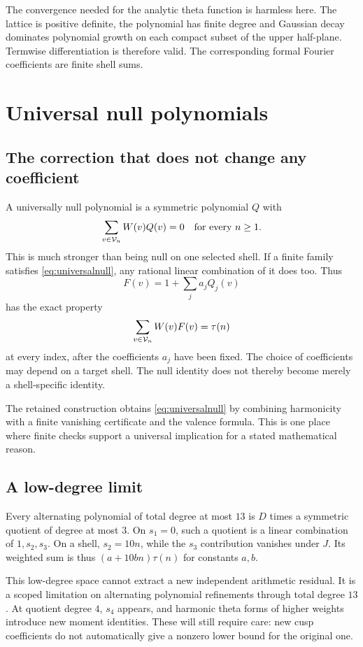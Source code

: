 The convergence needed for the analytic theta function is harmless here. The lattice is positive definite, the polynomial has finite degree and Gaussian decay dominates polynomial growth on each compact subset of the upper half-plane. Termwise differentiation is therefore valid. The corresponding formal Fourier coefficients are finite shell sums.

\chapter{Universal null polynomials}\label{ch:nulls}
\section{The correction that does not change any coefficient}
A universally null polynomial is a symmetric polynomial $Q$ with
\begin{equation}\label{eq:universalnull}
\sum_{v\in\mathcal V_n}W(v)Q(v)=0\quad\text{for every }n\ge1.
\end{equation}
This is much stronger than being null on one selected shell. If a finite family satisfies \eqref{eq:universalnull}, any rational linear combination of it does too. Thus
\[
F(v)=1+\sum_j a_jQ_j(v)
\]
has the exact property
\begin{equation}\label{eq:correctedtotal}
\sum_{v\in\mathcal V_n}W(v)F(v)=\tau(n)
\end{equation}
at every index, after the coefficients $a_j$ have been fixed. The choice of coefficients may depend on a target shell. The null identity does not thereby become merely a shell-specific identity.

The retained construction obtains \eqref{eq:universalnull} by combining harmonicity with a finite vanishing certificate and the valence formula. This is one place where finite checks support a universal implication for a stated mathematical reason.

\section{A low-degree limit}
Every alternating polynomial of total degree at most $13$ is $D$ times a symmetric quotient of degree at most $3$. On $s_1=0$, such a quotient is a linear combination of $1,s_2,s_3$. On a shell, $s_2=10n$, while the $s_3$ contribution vanishes under $J$. Its weighted sum is thus $(a+10bn)\tau(n)$ for constants $a,b$.

This low-degree space cannot extract a new independent arithmetic residual. It is a scoped limitation on alternating polynomial refinements through total degree $13$. At quotient degree $4$, $s_4$ appears, and harmonic theta forms of higher weights introduce new moment identities. These will still require care: new cusp coefficients do not automatically give a nonzero lower bound for the original one.

